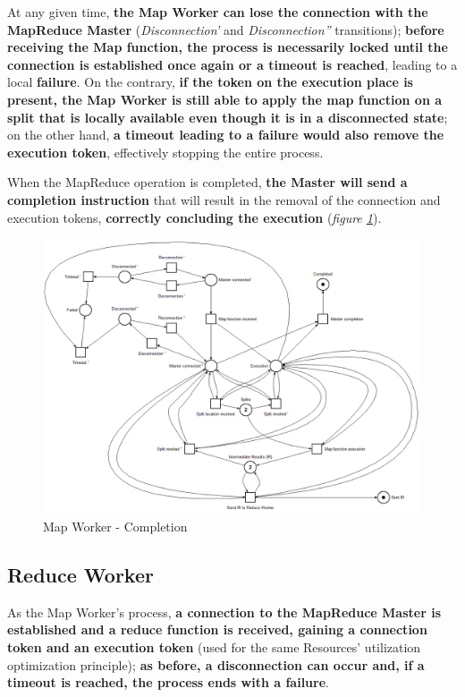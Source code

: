\vspace{2mm}

At any given time, \textbf{the Map Worker can lose the connection with the MapReduce Master} (\textit{Disconnection'} and \textit{Disconnection''} transitions); \textbf{before receiving the Map function, the process is necessarily locked until the connection is established once again or a timeout is reached}, leading to a local \textbf{failure}. On the contrary, \textbf{if the token on the execution place is present, the Map Worker is still able to apply the map function on a split that is locally available even though it is in a disconnected state}; on the other hand, \textbf{a timeout leading to a failure would also remove the execution token}, effectively stopping the entire process.

When the MapReduce operation is completed, \textbf{the Master will send a completion instruction} that will result in the removal of the connection and execution tokens, \textbf{correctly concluding the execution} (\textit{figure \ref{fig:map_worker_petri_net_4}}).

\begin{figure}[!ht]
    \centering
    \includegraphics[scale=0.45]{document/chapters/chapter_6/images/map_worker_petri_net_4.png}
    \caption{Map Worker - Completion}
    \label{fig:map_worker_petri_net_4}
\end{figure}

\subsection{Reduce Worker}
As the Map Worker's process, \textbf{a connection to the MapReduce Master is established and a reduce function is received, gaining a connection token and an execution token} (used for the same Resources' utilization optimization principle); \textbf{as before, a disconnection can occur and, if a timeout is reached, the process ends with a failure}.

